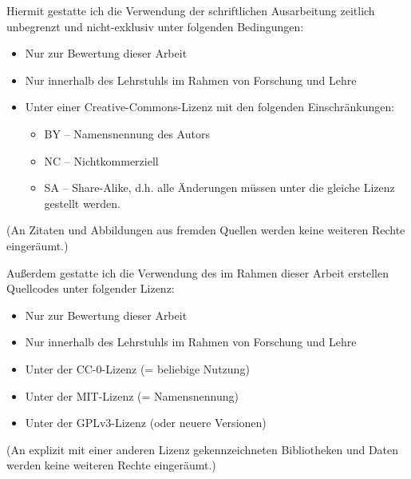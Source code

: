 \documentclass{mi-graduation}
\begin{document}
\begin{spacing}{1.15}
\noindent
Hiermit gestatte ich die Verwendung der schriftlichen Ausarbeitung zeitlich unbegrenzt und nicht-exklusiv unter folgenden Bedingungen:

\bigskip
\noindent
\begin{spacing}{1}
 \begin{itemize}
  \item[]{\checkbox Nur zur Bewertung dieser Arbeit}
  \item[]{\checkbox Nur innerhalb des Lehrstuhls im Rahmen von Forschung und Lehre}
  \item[]{\checkbox Unter einer Creative-Commons-Lizenz mit den folgenden Einschränkungen:}
  \begin{itemize}
   \item[]{\checkbox BY – Namensnennung des Autors}
   \item[]{\checkbox NC – Nichtkommerziell}
   \item[]{\checkbox SA – Share-Alike, d.h. alle Änderungen müssen unter die gleiche Lizenz gestellt werden.}
  \end{itemize}
 \end{itemize}
\end{spacing}

\bigskip
\noindent
(An Zitaten und Abbildungen aus fremden Quellen werden keine weiteren Rechte eingeräumt.)

\bigskip
\noindent
Außerdem gestatte ich die Verwendung des im Rahmen dieser Arbeit erstellen Quellcodes unter folgender Lizenz:

\begin{spacing}{1}
 \begin{itemize}
  \item[]{\checkbox Nur zur Bewertung dieser Arbeit}
  \item[]{\checkbox Nur innerhalb des Lehrstuhls im Rahmen von Forschung und Lehre}
  \item[]{\checkbox Unter der CC-0-Lizenz (= beliebige Nutzung)}
  \item[]{\checkbox Unter der MIT-Lizenz (= Namensnennung)}
  \item[]{\checkbox Unter der GPLv3-Lizenz (oder neuere Versionen)}
 \end{itemize}
\end{spacing}

\bigskip
\noindent
(An explizit mit einer anderen Lizenz gekennzeichneten Bibliotheken und Daten werden keine weiteren Rechte eingeräumt.)


\end{spacing}
\end{document}
